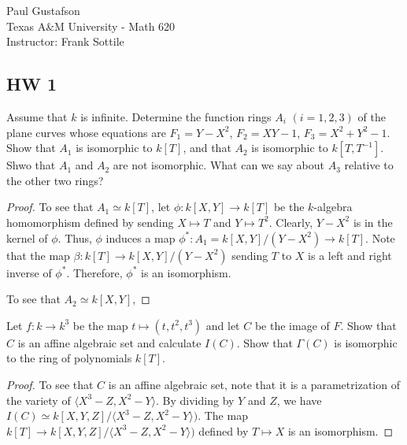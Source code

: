 \documentclass{article}
\begin{document}
\noindent Paul Gustafson\\
\noindent Texas A\&M University - Math 620\\ 
\noindent Instructor: Frank Sottile

\subsection*{HW 1}
 Assume that $k$ is infinite. Determine the function rings $A_i$ $(i = 1,2,3)$ of the plane curves whose equations are $F_1 = Y - X^2$, $F_2 = XY -1 $, $F_3 = X^2 + Y^2 - 1$. Show that $A_1$ is isomorphic to $k[T]$, and that $A_2$ is isomorphic to $k[T, T^{-1}]$. Shwo that $A_1$ and $A_2$ are not isomorphic. What can we say about $A_3$ relative to the other two rings?
\begin{proof}
To see that $A_1 \simeq k[T]$, let $\phi: k[X,Y] \to k[T]$ be the $k$-algebra homomorphism defined by sending $X \mapsto T$ and $Y \mapsto T^2$.  Clearly, $Y - X^2$ is in the kernel of $\phi$.  Thus, $\phi$ induces a map $\phi^*: A_1 = k[X,Y]/(Y - X^2) \to k[T]$.  Note that the map $\beta: k[T] \to k[X,Y]/(Y - X^2)$ sending $T$ to $X$ is a left and right inverse of $\phi^*$.  Therefore, $\phi^*$ is an isomorphism.

To see that $A_2 \simeq k[X,Y]$,
\end{proof}

 Let $f: k \to k^3$ be the map $t \mapsto (t, t^2, t^3)$ and let $C$ be the image of $F$. Show that $C$ is an affine algebraic set and calculate $I(C)$. Show that $\Gamma(C)$ is isomorphic to the ring of polynomials $k[T]$.
\begin{proof}
To see that $C$ is an affine algebraic set, note that it is a parametrization of the variety of $\langle X^3 - Z, X^2 - Y \rangle$.
By dividing by $Y$ and $Z$, we have $I(C) \simeq k[X,Y,Z] / \langle X^3 - Z, X^2 - Y \rangle)$.  The map $k[T] \to k[X,Y,Z] / \langle X^3 - Z, X^2 - Y \rangle)$ defined by $T \mapsto X$ is an isomorphism.
\end{proof}
\end{document}
